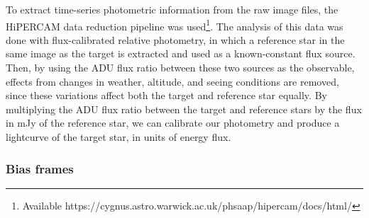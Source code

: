To extract time-series photometric information from the raw image files, the HiPERCAM data reduction pipeline was used\footnote{Available https://cygnus.astro.warwick.ac.uk/phsaap/hipercam/docs/html/}.
The analysis of this data was done with flux-calibrated relative photometry, in which a reference star in the same image as the target is extracted and used as a known-constant flux source. Then, by using the ADU flux ratio between these two sources as the observable, effects from changes in weather, altitude, and seeing conditions are removed, since these variations affect both the target and reference star equally. By multiplying the ADU flux ratio between the target and reference stars by the flux in mJy of the reference star, we can calibrate our photometry and produce a lightcurve of the target star, in units of energy flux.


\subsubsection{Bias frames}
\label{sect:observations:bias frames}

